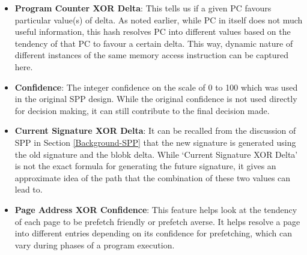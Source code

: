 \begin{itemize}
\item \textbf{Program Counter XOR Delta}: This tells us if a given PC
  favours particular value(s) of delta.  As noted earlier, while PC in
  itself does not much useful information, this hash resolves PC into
  different values based on the tendency of that PC to favour a
  certain delta.  This way, dynamic nature of different instances of
  the same memory access instruction can be captured here.

\item \textbf{Confidence}: The integer confidence on the scale of 0 to
  100 which was used in the original SPP design.  While the original
  confidence is not used directly for decision making, it can still
  contribute to the final decision made.

\item \textbf{Current Signature XOR Delta}: It can be recalled from
  the discussion of SPP in Section \ref{Background-SPP} that the new signature is
  generated using the old signature and the blobk delta.  While
  `Current Signature XOR Delta' is not the exact formula for
  generating the future signature, it gives an approximate idea of the
  path that the combination of these two values can lead to.

\item \textbf{Page Address XOR Confidence}: This feature helps look at the 
tendency of each page to be prefetch friendly or prefetch averse. It 
helps resolve a page into different entries depending on its confidence 
for prefetching, which can vary during phases of a program execution.


\end{itemize} 

